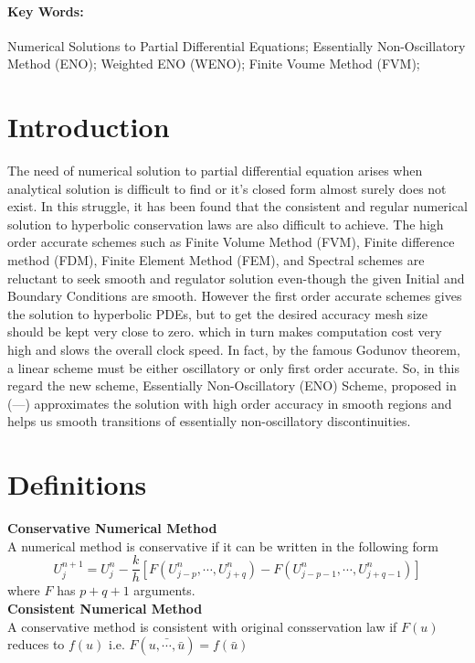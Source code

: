 \documentclass{article}
\begin{document}
\paragraph{\textbf{Key Words:}}
Numerical Solutions to Partial Differential Equations; Essentially Non-Oscillatory Method (ENO); Weighted ENO (WENO); Finite Voume Method (FVM);

\section{Introduction}
 The need of numerical solution to partial differential equation arises when analytical solution is difficult to find or it's closed form almost surely does not exist. In this struggle, it has been found that the consistent and regular numerical solution to hyperbolic conservation laws are also difficult to achieve. The high order accurate schemes such as Finite Volume Method (FVM), Finite difference method (FDM), Finite Element Method (FEM), and Spectral schemes are reluctant to seek smooth and regulator solution even-though the given Initial and Boundary Conditions are smooth. However the first order accurate schemes gives the solution to hyperbolic PDEs, but to get the desired accuracy mesh size should be kept very close to zero. which in turn makes computation cost very high and slows the overall clock speed. 
In fact, by the famous Godunov theorem, a linear scheme must be either oscillatory or only first order accurate. So, in this regard the new scheme, Essentially Non-Oscillatory (ENO) Scheme, proposed in (---)  approximates the solution with high order accuracy in smooth regions and helps us smooth transitions of essentially non-oscillatory discontinuities.


\section{Definitions}
\noindent \textbf{Conservative Numerical Method}\\
A numerical method is conservative if it can be written in the following form 
\begin{equation}
    U^{n+1}_{j} = U^n_j - \frac{k}{h} \left[ F(U^n_{j-p},\cdots,U^n_{j+q} ) - F(U^n_{j-p-1},\cdots,U^n_{j+q-1} )  \right]
\end{equation}
where $F$ has $p+q+1$ arguments.\\

\noindent \textbf{Consistent Numerical Method}\\
A conservative method is consistent with original consservation law if $F(u)$ reduces to $f(u)$ i.e. $F(\bar{u,\cdots,\bar{u}}) = f(\bar{u})$\\
\end{document}
